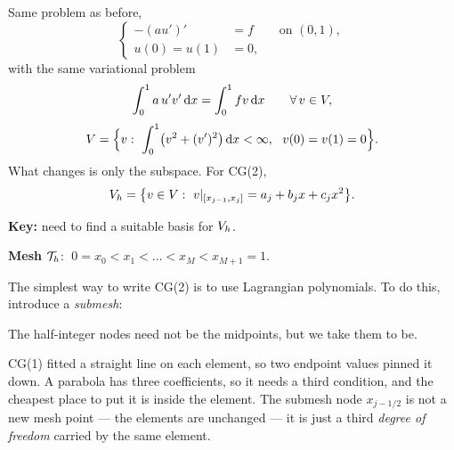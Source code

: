 Same problem as before,
\begin{equation}\label{eq:l10bvp}
  \left\{
  \begin{aligned}
    -(au')'&=f &&\text{on }(0,1),\\
    u(0)=u(1)&=0,
  \end{aligned}\right.
\end{equation}
with the same variational problem
\begin{equation}\label{eq:l10var}
  \int_0^1 a\,u'v'\,\mathrm{d} x=\int_0^1 f v\,\mathrm{d} x\qquad\forall\,v\in V ,
\end{equation}
\begin{equation}\label{eq:l10V}
  V=\Bigl\{v:\ \int_0^1\bigl(v^{2}+(v')^{2}\bigr)\,\mathrm{d} x<\infty,\ \
  v(0)=v(1)=0\Bigr\}.
\end{equation}
What changes is only the subspace. For CG(2),
\begin{equation}\label{eq:l10Vh}
  \Vh=\bigl\{v\in\Vsp:\ v|_{[x_{j-1},x_{j}]}=a_{j}+b_{j}x+c_{j}x^{2}\bigr\}.
\end{equation}

\medskip\noindent
\textbf{Key:} need to find a suitable basis for $V_{h}$.

\medskip\noindent
\textbf{Mesh} $\mathcal{T}_{h}$: $\;0=x_{0}<x_{1}<\dots<x_{M}<x_{M+1}=1$.

\medskip\noindent
The simplest way to write CG(2) is to use Lagrangian polynomials. To do this,
introduce a \emph{submesh}:

\begin{center}
\end{center}

\noindent
The half-integer nodes need not be the midpoints, but we take them to be.

\begin{intuition}
CG(1) fitted a straight line on each element, so two endpoint values pinned it
down. A parabola has three coefficients, so it needs a third condition, and the
cheapest place to put it is inside the element. The submesh node
$x_{j-1/2}$ is not a new mesh point --- the elements are unchanged --- it is
just a third \emph{degree of freedom} carried by the same element.
\end{intuition}

